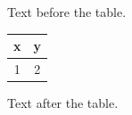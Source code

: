 \documentclass[12pt]{article}
\begin{document}
Text before the table.

\begin{center}\begin{tabular}{|c|c|}\hline x & y\\\hline 1 & 2\\\hline\end{tabular}\end{center}

Text after the table.
\end{document}

